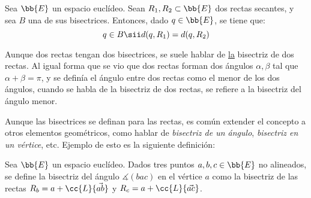 \begin{prop}\label{prop:BisectrizEquidistante}
    Sea $\bb{E}$ un espacio euclídeo. Sean $R_1,R_2\subset \bb{E}$ dos rectas secantes, y sea $B$ una de sus bisectrices. Entonces, dado $q\in \bb{E}$, se tiene que:
    \begin{equation*}
        q\in B \sii d(q,R_1)=d(q,R_2)
    \end{equation*}
\end{prop}

\begin{observacion}
    Aunque dos rectas tengan dos bisectrices, se suele hablar de \ul{la} bisectriz de dos rectas. Al igual forma que se vio que dos rectas forman
    dos ángulos $\alpha,\beta$ tal que $\alpha+\beta=\pi$, y se definía el ángulo entre dos rectas como el menor de los dos ángulos, cuando se
    habla de la bisectriz de dos rectas, se refiere a la bisectriz del ángulo menor.\\
\end{observacion}

Aunque las bisectrices se definan para las rectas, es común extender el concepto a otros elementos geométricos, como hablar de \emph{bisectriz de un ángulo},
\emph{bisectriz en un vértice}, etc. Ejemplo de esto es la siguiente definición:
\begin{definicion}
    Sea $\bb{E}$ un espacio euclídeo. Dados tres puntos $a,b,c\in \bb{E}$ no alineados, se define la bisectriz del ángulo $\measuredangle(bac)$
    en el vértice $a$ como la bisectriz de las rectas $R_b=a+\cc{L}\{\vec{ab}\}$ y $R_c=a+\cc{L}\{\vec{ac}\}$.
\end{definicion}


